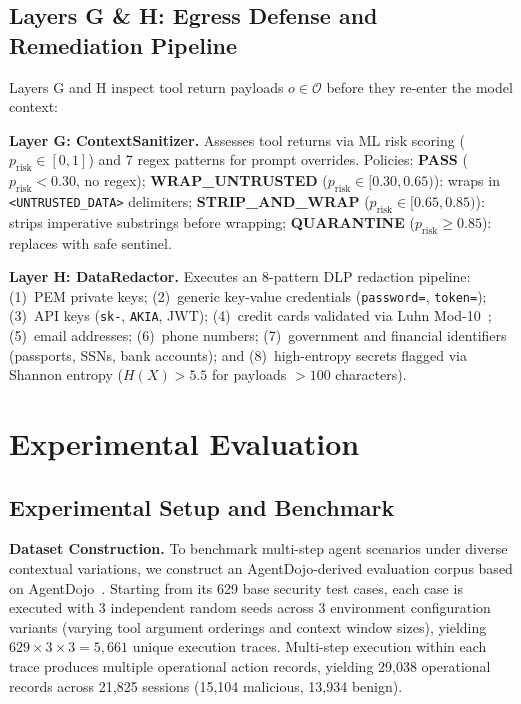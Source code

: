 \documentclass[runningheads]{llncs}
\begin{document}
\subsection{Layers G \& H: Egress Defense and Remediation Pipeline}
\label{sec:egress_defense}
Layers G and H inspect tool return payloads $o \in \mathcal{O}$ before they re-enter the model context:

\noindent\textbf{Layer G: ContextSanitizer.} Assesses tool returns via ML risk scoring ($p_{\text{risk}} \in [0,1]$) and 7 regex patterns for prompt overrides. Policies: \textbf{PASS} ($p_{\text{risk}} < 0.30$, no regex); \textbf{WRAP\_UNTRUSTED} ($p_{\text{risk}} \in [0.30, 0.65)$): wraps in \texttt{<UNTRUSTED\_DATA>} delimiters; \textbf{STRIP\_AND\_WRAP} ($p_{\text{risk}} \in [0.65, 0.85)$): strips imperative substrings before wrapping; \textbf{QUARANTINE} ($p_{\text{risk}} \ge 0.85$): replaces with safe sentinel.

\noindent\textbf{Layer H: DataRedactor.} Executes an 8-pattern DLP redaction pipeline: (1)~PEM private keys; (2)~generic key-value credentials (\texttt{password=}, \texttt{token=}); (3)~API keys (\texttt{sk-}, \texttt{AKIA}, JWT); (4)~credit cards validated via Luhn Mod-10~\cite{luhn1960mod10}; (5)~email addresses; (6)~phone numbers; (7)~government and financial identifiers (passports, SSNs, bank accounts); and (8)~high-entropy secrets flagged via Shannon entropy ($H(X) > 5.5$ for payloads $>100$ characters).

\section{Experimental Evaluation}
\label{sec:evaluation}

\subsection{Experimental Setup and Benchmark}

\noindent\textbf{Dataset Construction.} To benchmark multi-step agent scenarios under diverse contextual variations, we construct an AgentDojo-derived evaluation corpus based on AgentDojo~\cite{agentdojo2024}. Starting from its 629 base security test cases, each case is executed with 3 independent random seeds across 3 environment configuration variants (varying tool argument orderings and context window sizes), yielding $629 \times 3 \times 3 = 5{,}661$ unique execution traces. Multi-step execution within each trace produces multiple operational action records, yielding 29,038 operational records across 21,825 sessions (15,104 malicious, 13,934 benign).
\end{document}
